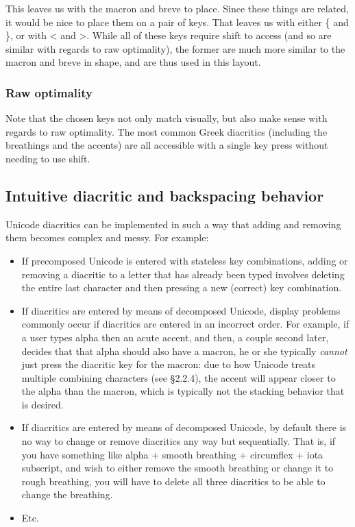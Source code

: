 \documentclass[11pt]{article}
\begin{document}
This leaves us with the macron and breve to place. Since these things are related, it would be nice to place them on a pair of keys. That leaves us with either \{ and \}, or with < and >. While all of these keys require shift to access (and so are similar with regards to raw optimality), the former are much more similar to the macron and breve in shape, and are thus used in this layout.

\subsubsection{Raw optimality}
\label{sec:org88f5fc7}

Note that the chosen keys not only match visually, but also make sense with regards to raw optimality. The most common Greek diacritics (including the breathings and the accents) are all accessible with a single key press without needing to use shift.

\subsection{Intuitive diacritic and backspacing behavior}
\label{sec:orgee379b7}

Unicode diacritics can be implemented in such a way that adding and removing them becomes complex and messy. For example:

\begin{itemize}
\item If precomposed Unicode is entered with stateless key combinations, adding or removing a diacritic to a letter that has already been typed involves deleting the entire last character and then pressing a new (correct) key combination.
\item If diacritics are entered by means of decomposed Unicode, display problems commonly occur if diacritics are entered in an incorrect order. For example, if a user types alpha then an acute accent, and then, a couple second later, decides that that alpha should also have a macron, he or she typically \emph{cannot} just press the diacritic key for the macron: due to how Unicode treats multiple combining characters (see §2.2.4), the accent will appear closer to the alpha than the macron, which is typically not the stacking behavior that is desired.
\item If diacritics are entered by means of decomposed Unicode, by default there is no way to change or remove diacritics any way but sequentially. That is, if you have something like alpha + smooth breathing + circumflex + iota subscript, and wish to either remove the smooth breathing or change it to rough breathing, you will have to delete all three diacritics to be able to change the breathing.
\item Etc.
\end{itemize}
\end{document}
